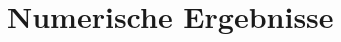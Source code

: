 \documentclass{beamer}
\begin{document}
\section{Numerische Ergebnisse}

%    

%    
%
%    
%    
\end{document}
